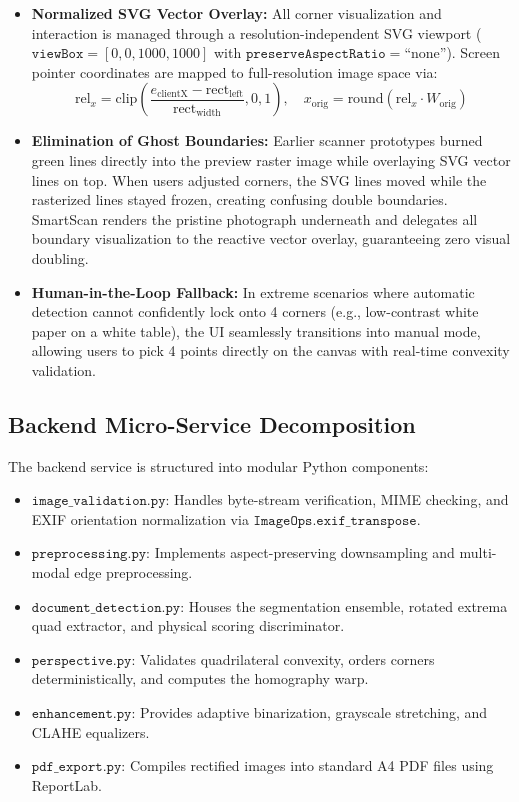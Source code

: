 \documentclass[11pt,a4paper]{article}
\begin{document}
\begin{itemize}[leftmargin=1.5em,itemsep=0.2em]
    \item \textbf{Normalized SVG Vector Overlay:} All corner visualization and interaction is managed through a resolution-independent SVG viewport ($\mathtt{viewBox} = [0, 0, 1000, 1000]$ with $\mathtt{preserveAspectRatio}=\text{``none''}$). Screen pointer coordinates are mapped to full-resolution image space via:
    \begin{equation}
        \text{rel}_x = \text{clip}\left(\frac{e_{\text{clientX}} - \text{rect}_{\text{left}}}{\text{rect}_{\text{width}}}, 0, 1\right), \quad x_{\text{orig}} = \text{round}(\text{rel}_x \cdot W_{\text{orig}})
    \end{equation}
    \item \textbf{Elimination of Ghost Boundaries:} Earlier scanner prototypes burned green lines directly into the preview raster image while overlaying SVG vector lines on top. When users adjusted corners, the SVG lines moved while the rasterized lines stayed frozen, creating confusing double boundaries. SmartScan renders the pristine photograph underneath and delegates all boundary visualization to the reactive vector overlay, guaranteeing zero visual doubling.
    \item \textbf{Human-in-the-Loop Fallback:} In extreme scenarios where automatic detection cannot confidently lock onto 4 corners (e.g., low-contrast white paper on a white table), the UI seamlessly transitions into manual mode, allowing users to pick 4 points directly on the canvas with real-time convexity validation.
\end{itemize}

\subsection{Backend Micro-Service Decomposition}
The backend service is structured into modular Python components:
\begin{itemize}[leftmargin=1.5em,itemsep=0.15em]
    \item $\mathtt{image\_validation.py}$: Handles byte-stream verification, MIME checking, and EXIF orientation normalization via $\mathtt{ImageOps.exif\_transpose}$.
    \item $\mathtt{preprocessing.py}$: Implements aspect-preserving downsampling and multi-modal edge preprocessing.
    \item $\mathtt{document\_detection.py}$: Houses the segmentation ensemble, rotated extrema quad extractor, and physical scoring discriminator.
    \item $\mathtt{perspective.py}$: Validates quadrilateral convexity, orders corners deterministically, and computes the homography warp.
    \item $\mathtt{enhancement.py}$: Provides adaptive binarization, grayscale stretching, and CLAHE equalizers.
    \item $\mathtt{pdf\_export.py}$: Compiles rectified images into standard A4 PDF files using ReportLab.
\end{itemize}
\end{document}
